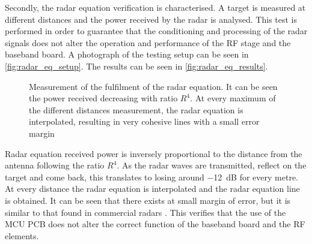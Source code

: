 Secondly, the radar equation \cite{Pozar2011} verification is characterised. A target is measured at different distances and the power received by the radar is analysed. This test is performed in order to guarantee that the conditioning and processing of the radar signals does not alter the operation and performance of the RF stage and the baseband board. A photograph of the testing setup can be seen in \cref{fig:radar_eq_setup}. The results can be seen in \cref{fig:radar_eq_results}.

\begin{figure}[htb]
	\centering
	\caption[Measurement of the fulfilment of the radar equation. It can be seen the power received decreasing with ratio $R^4$. At every maximum of the different distances measurement, the radar equation is interpolated, resulting in very cohesive lines with a small error margin]{Measurement of the fulfilment of the radar equation. It can be seen the power received decreasing with ratio $R^4$. At every maximum of the different distances measurement, the radar equation is interpolated, resulting in very cohesive lines with a small error margin \cite{Richards2010,Pozar2011} \label{fig:radar_eq}}
\end{figure}

Radar equation received power is inversely proportional to the distance from the antenna following the ratio $R^4$. As the radar waves are transmitted, reflect on the target and come back, this translates to losing around \SI{-12}{dB} for every metre. At every distance the radar equation is interpolated and the radar equation line is obtained. It can be seen that there exists at small margin of error, but it is similar to that found in commercial radars \cite{Richards2010,Pozar2011}. This verifies that the use of the MCU PCB does not alter the correct function of the baseband board and the RF elements.

